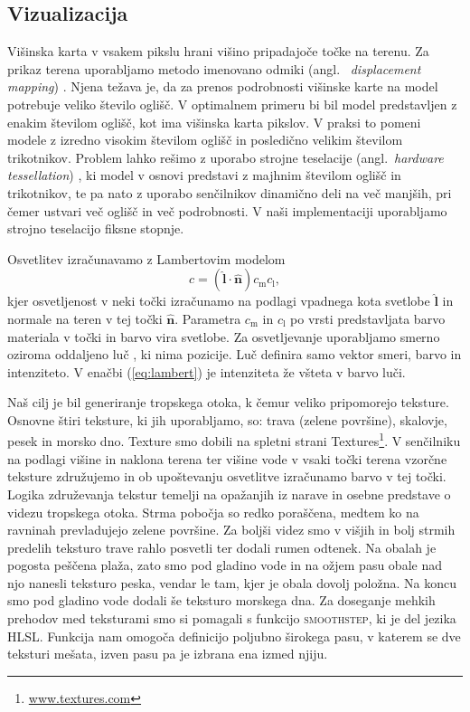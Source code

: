 \documentclass[9pt]{pnas-new}
\renewcommand{\vec}[1]{\ensuremath{\mathbf{#1}}}
\newcommand{\uvec}[1]{\ensuremath{\hat{\vec{#1}}}}
\begin{document}
\subsection*{Vizualizacija}
Višinska karta v vsakem pikslu hrani višino pripadajoče točke na terenu. Za prikaz terena uporabljamo metodo imenovano odmiki (angl.~ \textit{displacement mapping}) \cite{displacement_2008}. Njena težava je, da za prenos podrobnosti višinske karte na model potrebuje veliko število oglišč. V optimalnem primeru bi bil model predstavljen z enakim številom oglišč, kot ima višinska karta pikslov. V praksi to pomeni modele z izredno visokim številom oglišč in posledično velikim številom trikotnikov. Problem lahko rešimo z uporabo strojne teselacije (angl.~\emph{hardware tessellation}) \cite{tessellation_2016}, ki model v osnovi predstavi z majhnim številom oglišč in trikotnikov, te pa nato z uporabo senčilnikov dinamično deli na več manjših, pri čemer ustvari več oglišč in več podrobnosti. V naši implementaciji uporabljamo strojno teselacijo fiksne stopnje.

Osvetlitev izračunavamo z Lambertovim modelom \cite[str. 267--268]{interactive_graphics_2011}
\begin{equation} \label{eq:lambert}
c = (\uvec{l} \cdot \uvec{n}) c_\mathrm{m} c_\mathrm{l},
\end{equation}
kjer osvetljenost v neki točki izračunamo na podlagi vpadnega kota svetlobe $\uvec{l}$ in normale na teren v tej točki $\uvec{n}$. Parametra $c_\mathrm{m}$ in $c_\mathrm{l}$ po vrsti predstavljata barvo materiala v točki in barvo vira svetlobe. Za osvetljevanje uporabljamo smerno oziroma oddaljeno luč \cite[str. 264]{interactive_graphics_2011}, ki nima pozicije. Luč definira samo vektor smeri, barvo in intenziteto. V enačbi (\ref{eq:lambert}) je intenziteta že všteta v barvo luči.

Naš cilj je bil generiranje tropskega otoka, k čemur veliko pripomorejo teksture. Osnovne štiri teksture, ki jih uporabljamo, so: trava (zelene površine), skalovje, pesek in morsko dno. Texture smo dobili na spletni strani Textures\footnote{\href{http://www.textures.com/}{www.textures.com}}. V senčilniku na podlagi višine in naklona terena ter višine vode v vsaki točki terena vzorčne teksture združujemo in ob upoštevanju osvetlitve izračunamo barvo v tej točki. Logika združevanja tekstur temelji na opažanjih iz narave in osebne predstave o videzu tropskega otoka. Strma pobočja so redko poraščena, medtem ko na ravninah prevladujejo zelene površine. Za boljši videz smo v višjih in bolj strmih predelih teksturo trave rahlo posvetli ter dodali rumen odtenek. Na obalah je pogosta peščena plaža, zato smo pod gladino vode in na ožjem pasu obale nad njo nanesli teksturo peska, vendar le tam, kjer je obala dovolj položna. Na koncu smo pod gladino vode dodali še teksturo morskega dna. Za doseganje mehkih prehodov med teksturami smo si pomagali s funkcijo \textsc{smoothstep}, ki je del jezika HLSL. Funkcija nam omogoča definicijo poljubno širokega pasu, v katerem se dve teksturi mešata, izven pasu pa je izbrana ena izmed njiju.
\end{document}
